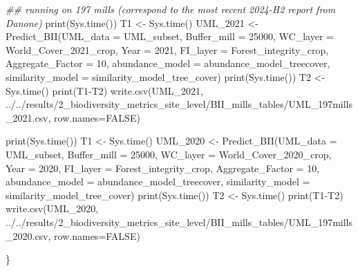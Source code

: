 \documentclass[
  letterpaper,
  DIV=11,
  numbers=noendperiod]{scrartcl}
\newenvironment{Shaded}{\begin{snugshade}}{\end{snugshade}}
\newcommand{\AttributeTok}[1]{\textcolor[rgb]{0.40,0.45,0.13}{#1}}
\newcommand{\ConstantTok}[1]{\textcolor[rgb]{0.56,0.35,0.01}{#1}}
\newcommand{\DecValTok}[1]{\textcolor[rgb]{0.68,0.00,0.00}{#1}}
\newcommand{\DocumentationTok}[1]{\textcolor[rgb]{0.37,0.37,0.37}{\textit{#1}}}
\newcommand{\FunctionTok}[1]{\textcolor[rgb]{0.28,0.35,0.67}{#1}}
\newcommand{\NormalTok}[1]{\textcolor[rgb]{0.00,0.23,0.31}{#1}}
\newcommand{\OtherTok}[1]{\textcolor[rgb]{0.00,0.23,0.31}{#1}}
\newcommand{\SpecialCharTok}[1]{\textcolor[rgb]{0.37,0.37,0.37}{#1}}
\newcommand{\StringTok}[1]{\textcolor[rgb]{0.13,0.47,0.30}{#1}}
\begin{document}
\begin{Shaded}
\begin{Highlighting}[]
\DocumentationTok{\#\# running on 197 mills (correspond to the most recent 2024{-}H2 report from Danone)}
\FunctionTok{print}\NormalTok{(}\FunctionTok{Sys.time}\NormalTok{())}
\NormalTok{T1 }\OtherTok{\textless{}{-}} \FunctionTok{Sys.time}\NormalTok{()}
\NormalTok{UML\_2021 }\OtherTok{\textless{}{-}} \FunctionTok{Predict\_BII}\NormalTok{(}\AttributeTok{UML\_data =}\NormalTok{ UML\_subset, }
                     \AttributeTok{Buffer\_mill =} \DecValTok{25000}\NormalTok{, }
                     \AttributeTok{WC\_layer =}\NormalTok{ World\_Cover\_2021\_crop,}
                     \AttributeTok{Year =} \DecValTok{2021}\NormalTok{,}
                     \AttributeTok{FI\_layer =}\NormalTok{ Forest\_integrity\_crop, }
                     \AttributeTok{Aggregate\_Factor =} \DecValTok{10}\NormalTok{,}
                     \AttributeTok{abundance\_model =}\NormalTok{ abundance\_model\_treecover, }
                     \AttributeTok{similarity\_model =}\NormalTok{ similarity\_model\_tree\_cover)}
\FunctionTok{print}\NormalTok{(}\FunctionTok{Sys.time}\NormalTok{())}
\NormalTok{T2 }\OtherTok{\textless{}{-}} \FunctionTok{Sys.time}\NormalTok{()}
\FunctionTok{print}\NormalTok{(T1}\SpecialCharTok{{-}}\NormalTok{T2) }
\FunctionTok{write.csv}\NormalTok{(UML\_2021, }\StringTok{\textquotesingle{}../../results/2\_biodiversity\_metrics\_site\_level/BII\_mills\_tables/UML\_197mills\_2021.csv\textquotesingle{}}\NormalTok{, }\AttributeTok{row.names=}\ConstantTok{FALSE}\NormalTok{)}

\FunctionTok{print}\NormalTok{(}\FunctionTok{Sys.time}\NormalTok{())}
\NormalTok{T1 }\OtherTok{\textless{}{-}} \FunctionTok{Sys.time}\NormalTok{()}
\NormalTok{UML\_2020 }\OtherTok{\textless{}{-}} \FunctionTok{Predict\_BII}\NormalTok{(}\AttributeTok{UML\_data =}\NormalTok{ UML\_subset, }
                     \AttributeTok{Buffer\_mill =} \DecValTok{25000}\NormalTok{, }
                     \AttributeTok{WC\_layer =}\NormalTok{ World\_Cover\_2020\_crop,}
                     \AttributeTok{Year =} \DecValTok{2020}\NormalTok{,}
                     \AttributeTok{FI\_layer =}\NormalTok{ Forest\_integrity\_crop, }
                     \AttributeTok{Aggregate\_Factor =} \DecValTok{10}\NormalTok{,}
                     \AttributeTok{abundance\_model =}\NormalTok{ abundance\_model\_treecover, }
                     \AttributeTok{similarity\_model =}\NormalTok{ similarity\_model\_tree\_cover)}
\FunctionTok{print}\NormalTok{(}\FunctionTok{Sys.time}\NormalTok{())}
\NormalTok{T2 }\OtherTok{\textless{}{-}} \FunctionTok{Sys.time}\NormalTok{()}
\FunctionTok{print}\NormalTok{(T1}\SpecialCharTok{{-}}\NormalTok{T2) }
\FunctionTok{write.csv}\NormalTok{(UML\_2020, }\StringTok{\textquotesingle{}../../results/2\_biodiversity\_metrics\_site\_level/BII\_mills\_tables/UML\_197mills\_2020.csv\textquotesingle{}}\NormalTok{, }\AttributeTok{row.names=}\ConstantTok{FALSE}\NormalTok{)}

\NormalTok{\}}
\end{Highlighting}
\end{Shaded}
\end{document}
